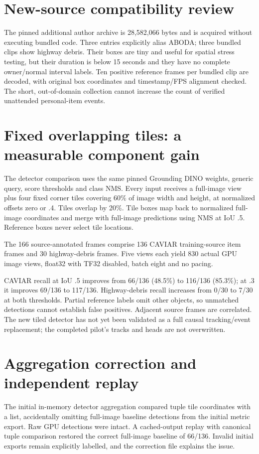 \section{New-source compatibility review}
The pinned additional author archive is 28,582,066 bytes and is acquired without executing bundled code. Three entries explicitly alias ABODA; three bundled clips show highway debris. Their boxes are tiny and useful for spatial stress testing, but their duration is below 15 seconds and they have no complete owner/normal interval labels. Ten positive reference frames per bundled clip are decoded, with original box coordinates and timestamp/FPS alignment checked. The short, out-of-domain collection cannot increase the count of verified unattended personal-item events.

\section{Fixed overlapping tiles: a measurable component gain}
The detector comparison uses the same pinned Grounding DINO weights, generic query, score thresholds and class NMS. Every input receives a full-image view plus four fixed corner tiles covering 60\% of image width and height, at normalized offsets zero or .4. Tiles overlap by 20\%. Tile boxes map back to normalized full-image coordinates and merge with full-image predictions using NMS at IoU .5. Reference boxes never select tile locations.

The 166 source-annotated frames comprise 136 CAVIAR training-source item frames and 30 highway-debris frames. Five views each yield 830 actual GPU image views, float32 with TF32 disabled, batch eight and no pacing.


CAVIAR recall at IoU .5 improves from 66/136 (48.5\%) to 116/136 (85.3\%); at .3 it improves 69/136 to 117/136. Highway-debris recall increases from 0/30 to 7/30 at both thresholds. Partial reference labels omit other objects, so unmatched detections cannot establish false positives. Adjacent source frames are correlated. The new tiled detector has not yet been validated as a full causal tracking/event replacement; the completed pilot's tracks and heads are not overwritten.

\section{Aggregation correction and independent replay}
The initial in-memory detector aggregation compared tuple tile coordinates with a list, accidentally omitting full-image baseline detections from the initial metric export. Raw GPU detections were intact. A cached-output replay with canonical tuple comparison restored the correct full-image baseline of 66/136. Invalid initial exports remain explicitly labelled, and the correction file explains the issue.

